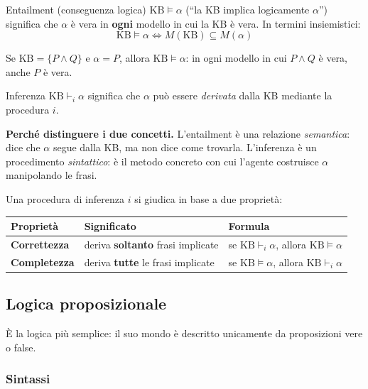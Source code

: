 \documentclass[11pt, a4paper]{article}
\renewcommand{\emph}[1]{\textcolor{verdechiaro}{\itshape #1}}
\newcommand{\intest}[1]{\textcolor{verde}{\sffamily\bfseries #1}}
\newcommand{\KB}{\mathrm{KB}}
\begin{document}
\begin{chiave}{Entailment (conseguenza logica)}
  $\KB \models \alpha$ (``la KB implica logicamente $\alpha$'') significa che $\alpha$ è vera in \textbf{ogni} modello in cui la KB è vera. In termini insiemistici:
  \[
    \KB \models \alpha \iff M(\KB) \subseteq M(\alpha)
  \]
\end{chiave}

\begin{esempio}
  Se $\KB = \{P \land Q\}$ e $\alpha = P$, allora $\KB \models \alpha$: in ogni modello in cui $P \land Q$ è vera, anche $P$ è vera.
\end{esempio}

\begin{defbox}{Inferenza}
  $\KB \vdash_i \alpha$ significa che $\alpha$ può essere \emph{derivata} dalla KB mediante la procedura $i$.
\end{defbox}

\textbf{Perché distinguere i due concetti.} L'entailment è una relazione \emph{semantica}: dice che $\alpha$ segue dalla KB, ma non dice come trovarla. L'inferenza è un procedimento \emph{sintattico}: è il metodo concreto con cui l'agente costruisce $\alpha$ manipolando le frasi.

Una procedura di inferenza $i$ si giudica in base a due proprietà:

\begin{center}
  \renewcommand{\arraystretch}{1.35}
  \begin{tabular}{>{\bfseries}l l l}
    \toprule
    \intest{Proprietà} & \intest{Significato} & \intest{Formula} \\
    \midrule
    Correttezza & deriva \textbf{soltanto} frasi implicate & se $\KB \vdash_i \alpha$, allora $\KB \models \alpha$ \\
    Completezza & deriva \textbf{tutte} le frasi implicate & se $\KB \models \alpha$, allora $\KB \vdash_i \alpha$ \\
    \bottomrule
  \end{tabular}
\end{center}

\clearpage
\subsection{Logica proposizionale}

È la logica più semplice: il suo mondo è descritto unicamente da proposizioni vere o false.

\subsubsection*{Sintassi}
\end{document}

